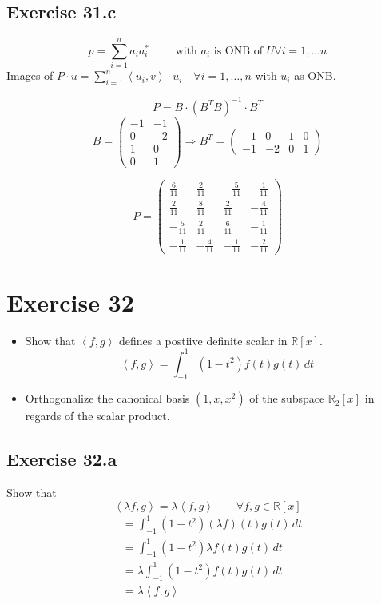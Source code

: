 \documentclass[a4paper]{article}
\theoremstyle{definition}
\newcommand\fun[1]{\left\langle{#1}\right\rangle}
\begin{document}
\subsection{Exercise 31.c}
\[ p = \sum_{i=1}^n a_i a_i^* \qquad \text{ with } a_i \text{ is ONB of } U \forall i = 1, \ldots n \]
Images of $P \cdot u = \sum_{i=1}^n \fun{u_i, v} \cdot u_i \quad \forall i = 1,\ldots,n$ with $u_i$ as ONB.

\[ P = B \cdot (B^T B)^{-1} \cdot B^T \]
\[
  B = \begin{pmatrix} -1 & -1 \\ 0 & -2 \\ 1 & 0 \\ 0 & 1 \end{pmatrix}
  \Rightarrow B^T = \begin{pmatrix} -1 & 0 & 1 & 0 \\ -1 & -2 & 0 & 1 \end{pmatrix}
\]

\[
  P = \begin{pmatrix}
    \frac6{11} & \frac2{11} & -\frac5{11} & -\frac1{11} \\
    \frac2{11} & \frac8{11} & \frac2{11} & -\frac4{11} \\
    -\frac5{11} & \frac2{11} & \frac6{11} & -\frac{1}{11} \\
    -\frac1{11} & -\frac4{11} & -\frac1{11} & -\frac2{11}
  \end{pmatrix}
\]

\section{Exercise 32}
\begin{ex}
  \begin{itemize}
    \item Show that $\fun{f,g}$ defines a postiive definite scalar in $\mathbb R[x]$.
      \[ \fun{f,g} = \int_{-1}^1 (1 - t^2) f(t) g(t) \, dt \]
    \item Orthogonalize the canonical basis $(1, x, x^2)$ of the subspace $\mathbb R_2[x]$ in regards of the scalar product.
  \end{itemize}
\end{ex}

\subsection{Exercise 32.a}
Show that
\[ \fun{\lambda f, g} = \lambda \fun{f,g} \qquad \forall f,g \in \mathbb R[x] \]
\begin{align*}
  &= \int_{-1}^1 (1 - t^2) (\lambda f)(t) g(t) \, dt \\
  &= \int_{-1}^1 (1 - t^2) \lambda f(t) g(t) \, dt \\
  &= \lambda \int_{-1}^1 (1 - t^2) f(t) g(t) \, dt \\
  &= \lambda \fun{f, g}
\end{align*}
\end{document}
